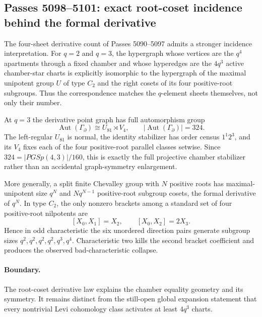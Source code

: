 \ifdefined\WPassFiveZeroNineEightLoaded\else
\gdef\WPassFiveZeroNineEightLoaded{1}
\subsection*{Passes 5098--5101: exact root-coset incidence behind the formal derivative}
The four-sheet derivative count of Passes 5090--5097 admits a stronger incidence interpretation.  For $q=2$ and $q=3$, the hypergraph whose vertices are the $q^4$ apartments through a fixed chamber and whose hyperedges are the $4q^3$ active chamber-star charts is explicitly isomorphic to the hypergraph of the maximal unipotent group $U$ of type $C_2$ and the right cosets of its four positive-root subgroups.  Thus the correspondence matches the $q$-element sheets themselves, not only their number.

At $q=3$ the derivative point graph has full automorphism group
\[
 \operatorname{Aut}(\Gamma_{\partial})\cong U_{81}\rtimes V_4,
 \qquad |\operatorname{Aut}(\Gamma_{\partial})|=324.
\]
The left-regular $U_{81}$ is normal, the identity stabilizer has order census $1^1 2^3$, and its $V_4$ fixes each of the four positive-root parallel classes setwise.  Since $324=|PGSp(4,3)|/160$, this is exactly the full projective chamber stabilizer rather than an accidental graph-symmetry enlargement.

More generally, a split finite Chevalley group with $N$ positive roots has maximal-unipotent size $q^N$ and $Nq^{N-1}$ positive-root subgroup cosets, the formal derivative of $q^N$.  In type $C_2$, the only nonzero brackets among a standard set of four positive-root nilpotents are
\[
 [X_0,X_1]=X_2,\qquad [X_0,X_2]=2X_3.
\]
Hence in odd characteristic the six unordered direction pairs generate subgroup sizes $q^2,q^2,q^2,q^2,q^3,q^4$.  Characteristic two kills the second bracket coefficient and produces the observed bad-characteristic collapse.

\paragraph{Boundary.}
The root-coset derivative law explains the chamber equality geometry and its symmetry.  It remains distinct from the still-open global expansion statement that every nontrivial Levi cohomology class activates at least $4q^3$ charts.
\fi
%
